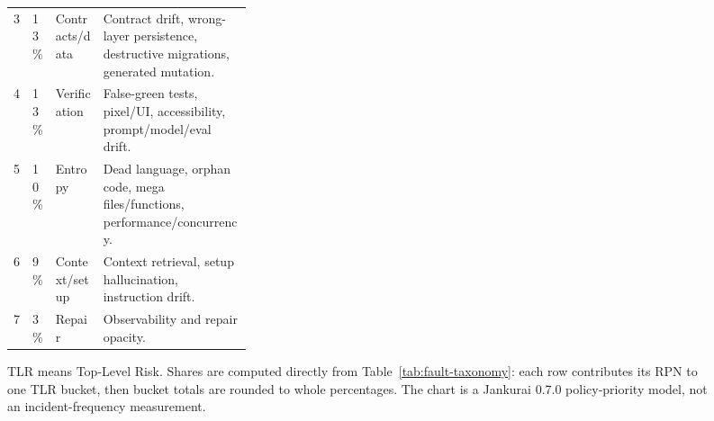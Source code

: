 \begin{figure}[t]
\begin{minipage}{0.60\textwidth}
\begin{tabularx}{\linewidth}{L{0.05\linewidth} L{0.09\linewidth} L{0.20\linewidth} Y}
3 & 13\% & Contracts/data & Contract drift, wrong-layer persistence, destructive migrations, generated mutation. \\
4 & 13\% & Verification & False-green tests, pixel/UI, accessibility, prompt/model/eval drift. \\
5 & 10\% & Entropy & Dead language, orphan code, mega files/functions, performance/concurrency. \\
6 & 9\% & Context/setup & Context retrieval, setup hallucination, instruction drift. \\
7 & 3\% & Repair & Observability and repair opacity. \\
\bottomrule
\end{tabularx}
\end{minipage}
\caption{TLR means Top-Level Risk. Shares are computed directly from Table~\ref{tab:fault-taxonomy}: each row contributes its RPN to one TLR bucket, then bucket totals are rounded to whole percentages. The chart is a Jankurai 0.7.0 policy-priority model, not an incident-frequency measurement.}
\label{fig:tlr-pie}
\end{figure}

